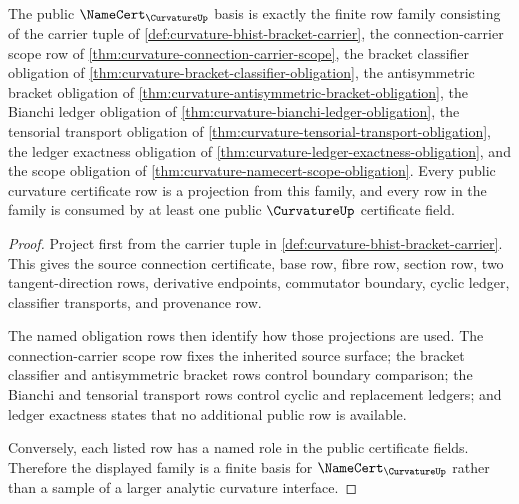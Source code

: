 \begin{theorem}
\label{thm:curvature-namecert-finite-basis}
The public $\NameCert_{\CurvatureUp}$ basis is exactly the finite row family consisting of the carrier tuple of \autoref{def:curvature-bhist-bracket-carrier}, the connection-carrier scope row of \autoref{thm:curvature-connection-carrier-scope}, the bracket classifier obligation of \autoref{thm:curvature-bracket-classifier-obligation}, the antisymmetric bracket obligation of \autoref{thm:curvature-antisymmetric-bracket-obligation}, the Bianchi ledger obligation of \autoref{thm:curvature-bianchi-ledger-obligation}, the tensorial transport obligation of \autoref{thm:curvature-tensorial-transport-obligation}, the ledger exactness obligation of \autoref{thm:curvature-ledger-exactness-obligation}, and the scope obligation of \autoref{thm:curvature-namecert-scope-obligation}. Every public curvature certificate row is a projection from this family, and every row in the family is consumed by at least one public $\CurvatureUp$ certificate field.
\end{theorem}
\begin{proof}
Project first from the carrier tuple in \autoref{def:curvature-bhist-bracket-carrier}. This gives the source connection certificate, base row, fibre row, section row, two tangent-direction rows, derivative endpoints, commutator boundary, cyclic ledger, classifier transports, and provenance row.

The named obligation rows then identify how those projections are used. The connection-carrier scope row fixes the inherited source surface; the bracket classifier and antisymmetric bracket rows control boundary comparison; the Bianchi and tensorial transport rows control cyclic and replacement ledgers; and ledger exactness states that no additional public row is available.

Conversely, each listed row has a named role in the public certificate fields. Therefore the displayed family is a finite basis for $\NameCert_{\CurvatureUp}$ rather than a sample of a larger analytic curvature interface.
\end{proof}

